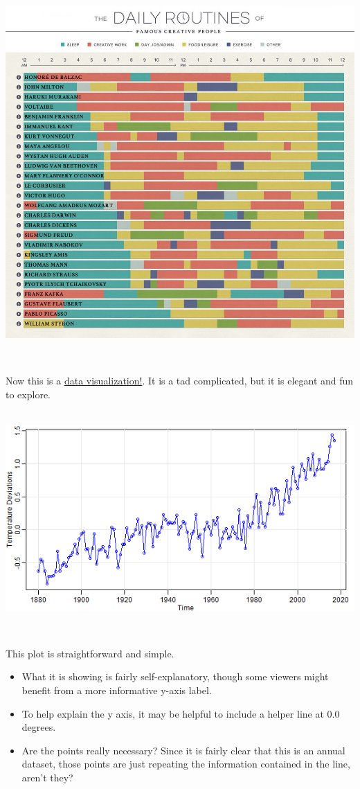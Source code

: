 \documentclass[]{book}
\providecommand{\tightlist}{%
  \setlength{\itemsep}{0pt}\setlength{\parskip}{0pt}}
\begin{document}
~\\

\includegraphics{img/vis-routines.jpeg}

~

Now this is a \href{https://podio.com/site/creative-routines}{data visualization!}. It is a tad complicated, but it is elegant and fun to explore.

~\\

\includegraphics{img/visi.png}

~

This plot is straightforward and simple.

\begin{itemize}
\tightlist
\item
  What it is showing is fairly self-explanatory, though some viewers might benefit from a more informative y-axis label.
\item
  To help explain the y axis, it may be helpful to include a helper line at 0.0 degrees.\\
\item
  Are the points really necessary? Since it is fairly clear that this is an annual dataset, those points are just repeating the information contained in the line, aren't they?
\end{itemize}
\end{document}
